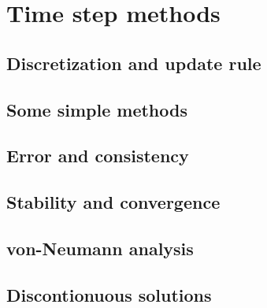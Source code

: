 \section{Time step methods}


\subsection{Discretization and update rule}


\subsection{Some simple methods}


\subsection{Error and consistency}


\subsection{Stability and convergence}


\subsection{von-Neumann analysis}


\subsection{Discontionuous solutions}